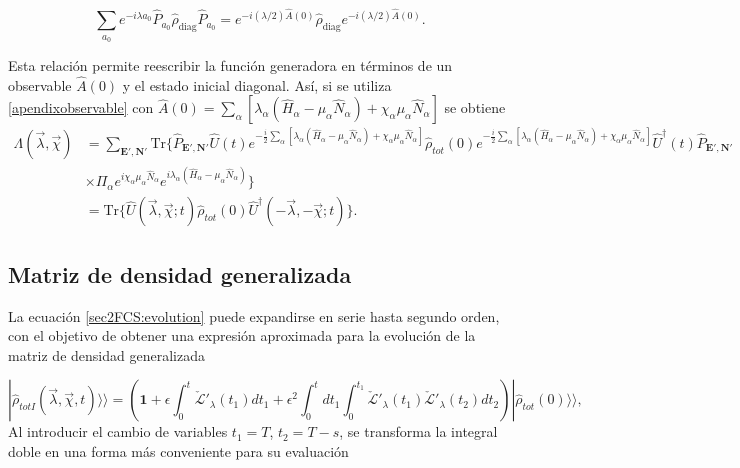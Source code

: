 \begin{appendixs}
\begin{equation}
    \sum_{a_0} e^{-i\lambda a_0} \hat{P}_{a_0} \hat{\rho}_{\text{diag}} \hat{P}_{a_0} 
    = e^{-i(\lambda/2)\hat{A}(0)} \hat{\rho}_{\text{diag}} e^{-i(\lambda/2)\hat{A}(0)}.
    \label{apendixobservable}
\end{equation}

Esta relación permite reescribir la función generadora en términos de un observable $\hat{A}(0)$ y el estado inicial diagonal. Así, si se utiliza \ref{apendixobservable} con $\hat{A}(0) = \sum_{\alpha}[\lambda_{\alpha}(\hat{H}_{\alpha}-\mu_{\alpha}\hat{N}_{\alpha}) + \chi_{\alpha}\mu_{\alpha}\hat{N}_{\alpha}] $ se obtiene 
\begin{align*}
    \Lambda(\vec{\lambda},\vec{\chi}) & = \sum_{\textbf{E}',\textbf{N}'}\text{Tr}\{ \hat{P}_{\textbf{E}',\textbf{N}'} \hat{U}(t) e^{-\frac{i}{2}\sum_{\alpha}[\lambda_{\alpha}(\hat{H}_{\alpha} - \mu_{\alpha}\hat{N}_{\alpha}) + \chi_{\alpha}\mu_{\alpha}\hat{N}_{\alpha}  ]}  \hat{\rho}_{tot}(0) e^{-\frac{i}{2}\sum_{\alpha}[\lambda_{\alpha}(\hat{H}_{\alpha} - \mu_{\alpha}\hat{N}_{\alpha}) + \chi_{\alpha}\mu_{\alpha}\hat{N}_{\alpha} ] }\hat{U}^{\dagger}(t) \hat{P}_{\textbf{E}',\textbf{N}'}  \\
    & \times \Pi_{\alpha}e^{i\chi_{\alpha}\mu_{\alpha}\hat{N}_{\alpha}}e^{i\lambda_{\alpha}(\hat{H}_{\alpha} -\mu_{\alpha}\hat{N}_{\alpha})} \} \\
    & = \text{Tr}\{ \hat{U}(\vec{\lambda},\vec{\chi};t)\hat{\rho}_{tot}(0)\hat{U}^{\dagger}(-\vec{\lambda},-\vec{\chi};t)  \}.
\end{align*}

\newpage 

    \subsection{Matriz de densidad generalizada}

La ecuación \ref{sec2FCS:evolution} puede expandirse en serie hasta segundo orden, con el objetivo de obtener una expresión aproximada para la evolución de la matriz de densidad generalizada

    \begin{equation*}
        |\hat{\rho}_{totI}(\vec{\lambda},\vec{\chi},t)\rangle \rangle  = \left( \textbf{1} + \epsilon \int_{0}^{t}\check{\mathcal{L}}'_{\lambda}(t_{1})dt_{1} + \epsilon^{2}\int_{0}^{t}dt_{1}\int_{0}^{t_{1}}\check{\mathcal{L}}'_{\lambda}(t_{1})\check{\mathcal{L}}'_{\lambda}(t_{2})dt_{2} \right) |\hat{\rho}_{tot}(0)\rangle \rangle, 
    \end{equation*}
Al introducir el cambio de variables \( t_1 = T \), \( t_2 = T - s \), se transforma la integral doble en una forma más conveniente para su evaluación


\end{appendixs}
